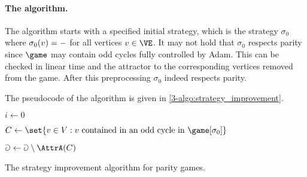 \paragraph{\bf The algorithm.}
The algorithm starts with a specified initial strategy, which is the strategy
$\sigma_0$ where $\sigma_0(v) = \mathtt{-}$ for all vertices $v \in \VE$. 
It may not hold that $\sigma_0$ respects parity since $\game$ may contain odd cycles fully controlled by Adam.
This can be checked in linear time and the attractor to the corresponding vertices removed from the game.
After this preprocessing $\sigma_0$ indeed respects parity.

The pseudocode of the algorithm is given in \cref{3-algo:strategy_improvement}.

\begin{algorithm}
 \DontPrintSemicolon
 
 $i \leftarrow 0$
 

 $C \leftarrow \set{v \in V : v \text{ contained in an odd cycle in } \game[\sigma_0]}$

 $\Game \leftarrow \Game \setminus \AttrA(C)$
 

 \caption{The strategy improvement algorithm for parity games.}
\label{3-algo:strategy_improvement}
\end{algorithm}


